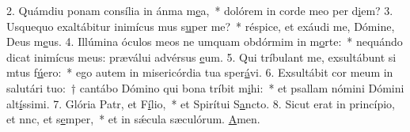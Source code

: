 2. Quámdiu ponam consília in ánma m\uline{e}a,~* dolórem in corde meo per d\uline{i}em?
3. Usquequo exaltábitur inimícus mus s\uline{u}per me?~* réspice, et exáudi me, Dómine, Deus m\uline{e}us.
4. Illúmina óculos meos ne umquam obdórmim in m\uline{o}rte:~* nequándo dicat inimícus meus: præválui advérsus \uline{e}um.
5. Qui tríbulant me, exsultábunt si mtus f\uline{ú}ero:~* ego autem in misericórdia tua sper\uline{á}vi.
6. Exsultábit cor meum in salutári tuo:~† cantábo Dómino qui bona tríbit m\uline{i}hi:~* et psallam nómini Dómini alt\uline{í}ssimi.
7. Glória Patr, et F\uline{í}lio,~* et Spirítui S\uline{a}ncto.
8. Sicut erat in princípio, et nnc, et s\uline{e}mper,~* et in sǽcula sæculórum. \uline{A}men.
